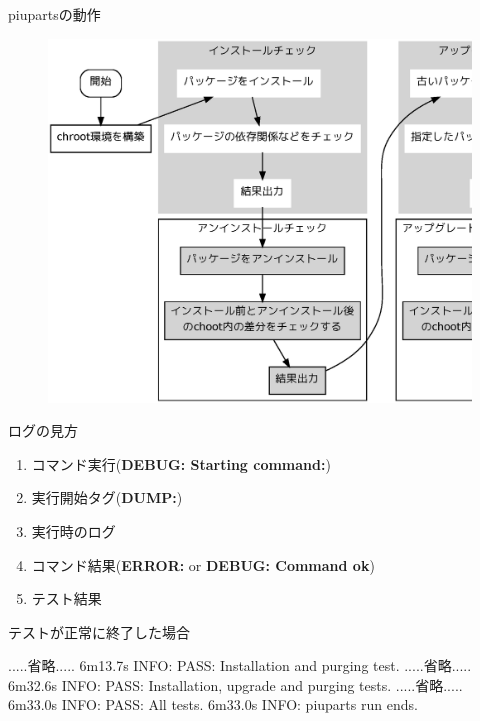 \begin{frame}{piupartsの動作}
\begin{figure}[H]
\includegraphics[height=0.7\hsize]{image201004/piuparts-process.eps}
\label{fig:piuparts-process}
\end{figure}

\end{frame}

\begin{frame}{ログの見方}

\begin{enumerate}
\item コマンド実行({\bf DEBUG: Starting command:})
\item 実行開始タグ({\bf DUMP:})
\item 実行時のログ
\item コマンド結果({\bf ERROR:} or {\bf DEBUG: Command ok})
\item テスト結果
\end{enumerate}
\end{frame}


\begin{frame}[containsverbatim]{テストが正常に終了した場合}

\begin{commandline}
.....省略.....
6m13.7s INFO: PASS: Installation and purging test.
.....省略.....
6m32.6s INFO: PASS: Installation, upgrade and purging tests.
.....省略.....
6m33.0s INFO: PASS: All tests.
6m33.0s INFO: piuparts run ends.
\end{commandline}
\end{frame}

